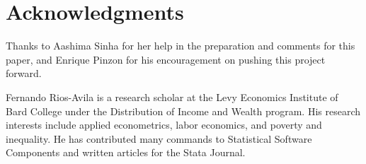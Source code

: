 \documentclass[bib]{statapress}
\begin{document}
\section{Acknowledgments}\label{acknowledgments}

Thanks to Aashima Sinha for her help in the preparation and comments for
this paper, and Enrique Pinzon for his encouragement on pushing this
project forward.

\clearpage





\begin{aboutauthors}

Fernando Rios-Avila is a research scholar at the Levy Economics
Institute of Bard College under the Distribution of Income and Wealth
program. His research interests include applied econometrics, labor
economics, and poverty and inequality. He has contributed many commands
to Statistical Software Components and written articles for the Stata
Journal.

\end{aboutauthors}
\end{document}
